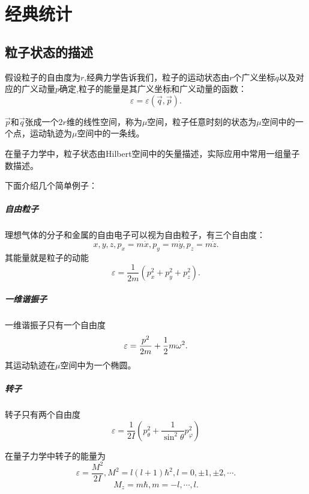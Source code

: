 \chapter{经典统计}
\section{粒子状态的描述}
假设粒子的自由度为$r$,经典力学告诉我们，粒子的运动状态由$r$个广义坐标$q$以及对应的广义动量$p$确定,粒子的能量是其广义坐标和广义动量的函数：
\begin{equation}
    \varepsilon=\varepsilon(\vec{q},\vec{p}).
\end{equation}

$\vec{p}$和$\vec{q}$张成一个$2r$维的线性空间，称为$\mu$空间，粒子任意时刻的状态为$\mu$空间中的一个点，运动轨迹为$\mu$空间中的一条线。

在量子力学中，粒子状态由Hilbert空间中的矢量描述，实际应用中常用一组量子数描述。

下面介绍几个简单例子：

\paragraph{自由粒子}理想气体的分子和金属的自由电子可以视为自由粒子，有三个自由度：
\begin{equation}
    x,y,z,p_x=m\dot{x},p_y=m\dot{y},p_z=m\dot{z}.
\end{equation}
其能量就是粒子的动能
\begin{equation}
    \varepsilon=\frac{1}{2m}\left(p_x^2+p_y^2+p_z^2\right).
\end{equation}

\paragraph{一维谐振子} 一维谐振子只有一个自由度
\begin{equation}
    \varepsilon=\frac{p^2}{2m}+\frac{1}{2} m\omega^2.
\end{equation}
其运动轨迹在$\mu$空间中为一个椭圆。

\paragraph{转子} 转子只有两个自由度
\begin{equation}
    \varepsilon=\frac{1}{2I}\left(p_\theta^2+\frac{1}{\sin^2\theta}p_\varphi^2\right)
\end{equation}

在量子力学中转子的能量为
\begin{equation}
    \varepsilon=\frac{M^2}{2I}, M^2=l(l+1)\hbar^2, l=0,\pm1, \pm2, \cdots.
\end{equation}
\begin{equation}
    M_z=m\hbar, m=-l,\cdots,l.
\end{equation}



